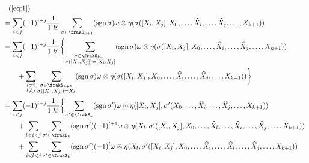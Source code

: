\documentclass[report]{jlreq}
\begin{document}
\begin{alignat}{1}
    &\phantom{=} (\cref{eq:1}) \\
    &= \sum_{i < j}
        (-1)^{i + j}
        \frac{1}{1! k!}
        \sum_{\sigma \in \fS_{k + 1}}
        (\sgn \sigma)
        \omega \otimes \eta(\sigma(
            [X_i, X_j], X_0, \dots, \what{X}_i, \dots, \what{X}_j, \dots, X_{k + 1}
        )) \\
    &= \sum_{i < j}
        (-1)^{i + j}
        \frac{1}{1! k!}
        \biggl\{
            \sum_{\substack{\sigma \in \fS_{k + 1} \\ \sigma([X_i, X_j]) = [X_i, X_j]}}
            (\sgn \sigma)
            \omega \otimes \eta(\sigma(
                [X_i, X_j], X_0, \dots, \what{X}_i, \dots, \what{X}_j, \dots, X_{k + 1}
            )) \\
    &\qquad
            + \sum_{\substack{l \neq i \\ l \neq j}}
            \sum_{\substack{\sigma \in \fS_{k + 1} \\ \sigma([X_i, X_j]) = X_l}}
            (\sgn \sigma)
            \omega \otimes \eta(\sigma(
                [X_i, X_j], X_0, \dots, \what{X}_i, \dots, \what{X}_j, \dots, X_{k + 1}
            ))
        \biggr\} \\
    &= \sum_{i < j}
        (-1)^{i + j}
        \frac{1}{1! k!}
        \biggl\{
            \sum_{\sigma' \in \fS_{k}}
            (\sgn \sigma')
            \omega \otimes \eta(
                [X_i, X_j],
                \sigma'(X_0, \dots, \what{X}_i, \dots, \what{X}_j, \dots, X_{k + 1})
            ) \\
    &\qquad
            + \sum_{l < i < j}
            \sum_{\sigma' \in \fS_{k}}
            (\sgn \sigma')
            (-1)^{l + 1}
            \omega \otimes \eta(
                X_l,
                \sigma'(
                    [X_i, X_j],
                    X_0, \dots,
                    \what{X}_l, \dots,
                    \what{X}_i, \dots,
                    \what{X}_j, \dots,
                    X_{k + 1}
                )
            ) \\
    &\qquad
            + \sum_{i < l < j}
            \sum_{\sigma' \in \fS_{k}}
            (\sgn \sigma')
            (-1)^{l}
            \omega \otimes \eta(
                X_l,
                \sigma'(
                    [X_i, X_j],
                    X_0, \dots,
                    \what{X}_i, \dots,
                    \what{X}_l, \dots,
                    \what{X}_j, \dots,
                    X_{k + 1}
                )
            ) \\

\end{alignat}
\end{document}
